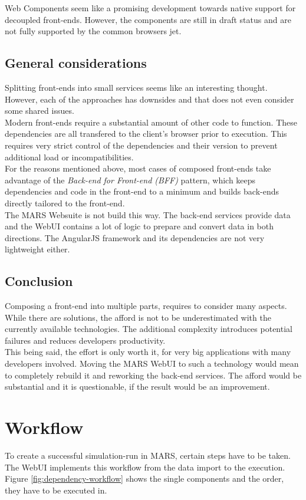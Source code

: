 Web Components seem like a promising development towards native support for decoupled front-ends. However, the components are still in draft status and are not fully supported by the common browsers jet.


\subsection{General considerations}
Splitting front-ends into small services seems like an interesting thought. However, each of the approaches has downsides and that does not even consider some shared issues.\\
Modern front-ends require a substantial amount of other code to function. These dependencies are all transfered to the client's browser prior to execution. This requires very strict control of the dependencies and their version to prevent additional load or incompatibilities.\\
For the reasons mentioned above, most cases of composed front-ends take advantage of the \textit{Back-end for Front-end (BFF)} pattern, which keeps dependencies and code in the front-end to a minimum and builds back-ends directly tailored to the front-end.\\
The MARS Websuite is not build this way. The back-end services provide data and the WebUI contains a lot of logic to prepare and convert data in both directions. The AngularJS framework and its dependencies are not very lightweight either.\\


\subsection{Conclusion}
Composing a front-end into multiple parts, requires to consider many aspects. While there are solutions, the afford is not to be underestimated with the currently available technologies. The additional complexity introduces potential failures and reduces developers productivity.\\
This being said, the effort is only worth it, for very big applications with many developers involved. Moving the MARS WebUI to such a technology would mean to completely rebuild it and reworking the back-end services. The afford would be substantial and it is questionable, if the result would be an improvement.



\section{Workflow}
To create a successful simulation-run in MARS, certain steps have to be taken. The WebUI implements this workflow from the data import to the execution. Figure \ref{fig:dependency-workflow} shows the single components and the order, they have to be executed in.

